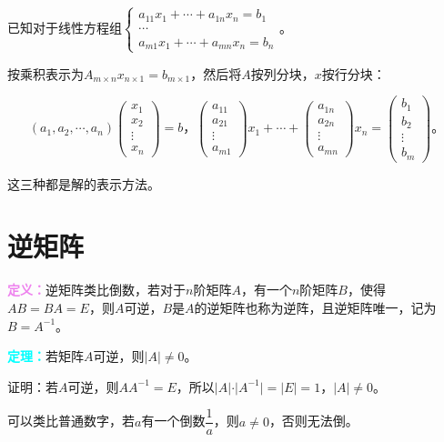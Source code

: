 \documentclass[UTF8, 12pt]{ctexart}
\begin{document}
已知对于线性方程组$\begin{cases}
    a_{11}x_1+\cdots+a_{1n}x_n=b_1 \\
    \cdots \\
    a_{m1}x_1+\cdots+a_{mn}x_n=b_n
\end{cases}$。

按乘积表示为$A_{m\times n}x_{n\times 1}=b_{m\times 1}$，然后将$A$按列分块，$x$按行分块：

$$(a_1,a_2,\cdots,a_n)\left(\begin{array}{c}
    x_1 \\
    x_2 \\
    \vdots \\
    x_n
\end{array}\right)=b\text{，}\left(\begin{array}{c}
    a_{11} \\
    a_{21} \\
    \vdots \\
    a_{m1}
\end{array}\right)x_1+\cdots+\left(\begin{array}{c}
    a_{1n} \\
    a_{2n} \\
    \vdots \\
    a_{mn}
\end{array}\right)x_n=\left(\begin{array}{c}
    b_1 \\
    b_2 \\
    \vdots \\
    b_m
\end{array}\right)\text{。}$$

这三种都是解的表示方法。

\section{逆矩阵}

\textcolor{violet}{\textbf{定义：}}逆矩阵类比倒数，若对于$n$阶矩阵$A$，有一个$n$阶矩阵$B$，使得$AB=BA=E$，则$A$可逆，$B$是$A$的逆矩阵也称为逆阵，且逆矩阵唯一，记为$B=A^{-1}$。

\textcolor{aqua}{\textbf{定理：}}若矩阵$A$可逆，则$\vert A\vert\neq 0$。

证明：若$A$可逆，则$AA^{-1}=E$，所以$\vert A\vert\cdot\vert A^{-1}\vert=\vert E\vert=1$，$\vert A\vert\neq 0$。

可以类比普通数字，若$a$有一个倒数$\dfrac{1}{a}$，则$a\neq 0$，否则无法倒。
\end{document}
